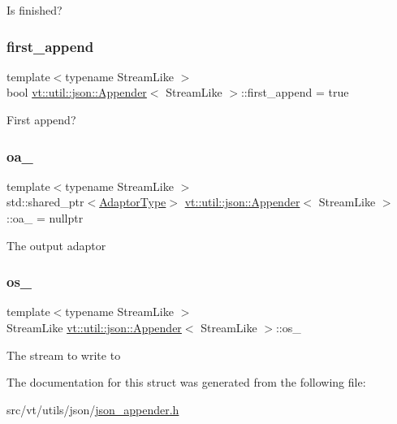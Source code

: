 Is finished? \mbox{\label{structvt_1_1util_1_1json_1_1_appender_a1c035d54bb69b9bab1136eab1dd69263}} 
\subsubsection{\texorpdfstring{first\+\_\+append}{first\_append}}
{\footnotesize\ttfamily template$<$typename Stream\+Like $>$ \\
bool \hyperlink{structvt_1_1util_1_1json_1_1_appender}{vt\+::util\+::json\+::\+Appender}$<$ Stream\+Like $>$\+::first\+\_\+append = true\hspace{0.3cm}{\ttfamily [private]}}

First append? \mbox{\label{structvt_1_1util_1_1json_1_1_appender_a43e091b8545dc6a7664bddc38ffd4e77}} 
\subsubsection{\texorpdfstring{oa\+\_\+}{oa\_}}
{\footnotesize\ttfamily template$<$typename Stream\+Like $>$ \\
std\+::shared\+\_\+ptr$<$\hyperlink{structvt_1_1util_1_1json_1_1_appender_ae7a25e7544d8529cb466651fff13db0b}{Adaptor\+Type}$>$ \hyperlink{structvt_1_1util_1_1json_1_1_appender}{vt\+::util\+::json\+::\+Appender}$<$ Stream\+Like $>$\+::oa\+\_\+ = nullptr\hspace{0.3cm}{\ttfamily [private]}}

The output adaptor \mbox{\label{structvt_1_1util_1_1json_1_1_appender_ab0078667ec1395e92014adc1aaa782e5}} 
\subsubsection{\texorpdfstring{os\+\_\+}{os\_}}
{\footnotesize\ttfamily template$<$typename Stream\+Like $>$ \\
Stream\+Like \hyperlink{structvt_1_1util_1_1json_1_1_appender}{vt\+::util\+::json\+::\+Appender}$<$ Stream\+Like $>$\+::os\+\_\+\hspace{0.3cm}{\ttfamily [private]}}

The stream to write to 

The documentation for this struct was generated from the following file\+:\begin{DoxyCompactItemize}
\item 
src/vt/utils/json/\hyperlink{json__appender_8h}{json\+\_\+appender.\+h}\end{DoxyCompactItemize}
